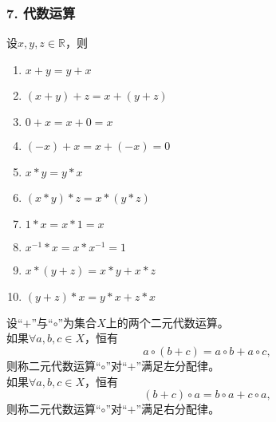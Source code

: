 \documentclass{beamer}
\begin{document}
\begin{CJK*}{UTF8}{gbsn}
\begin{frame}
  \frametitle{7. 代数运算}
  \begin{minipage}[t]{0.49\linewidth}
  \begin{block}{}
    设$x, y, z \in \mathbb{R}$，则
   \begin{enumerate}
   \item   $x + y = y + x$
   \item   $(x + y) + z = x + (y + z)$
   \item   $0 + x = x + 0 = x$
   \item   $(-x) + x = x + (-x) = 0$
   \item   $x * y = y * x$
   \item   $(x * y) * z = x * (y *z)$
   \item   $1 * x = x * 1 = x$
   \item   $x^{-1} * x = x * x^{-1} = 1$
   \item   $x* (y + z) = x * y + x * z$
   \item   $(y + z) * x = y * x + z * x$
    \end{enumerate}
  \end{block}\pause
\end{minipage}
\begin{minipage}[t]{0.49\linewidth}
  \begin{Def}
    设“$+$”与“$\circ$”为集合$X$上的两个二元代数运算。\\如果$\forall a, b, c \in X$，恒有\[a \circ (b + c) = a \circ b + a \circ c,\] 则称二元代数运算“$\circ$”对“$+$”满足\alert{左分配律}。
    \\如果$\forall a, b, c \in X$，恒有\[(b + c)\circ a = b \circ a + c \circ a,\] 则称二元代数运算“$\circ$”对“$+$”满足\alert{右分配律}。
  \end{Def}
\end{minipage}
\end{frame}


\end{CJK*}
\end{document}
